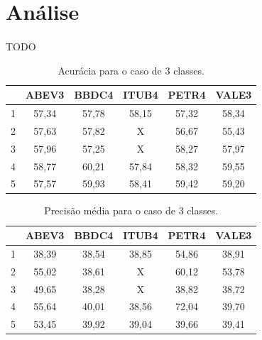 \documentclass[grad,numbers]{coppe}
\begin{document}
 		\section{Análise}
 			\paragraph{}TODO
 			\begin{table}[h]
 				\caption{Acurácia para o caso de 3 classes.}
 				\label{tab:3c_ac_analysis}
 				\centering
 				{\footnotesize
 					\begin{tabular}{|c|c|c|c|c|c|}
 						\hline
 						\diagbox[linewidth=0.2pt, width=\dimexpr \textwidth/10+2\tabcolsep\relax, height=0.8cm]{Dias}{Ativo}
 						& ABEV3 & BBDC4 & ITUB4 & PETR4 & VALE3\\
 						\hline
 						1 & 57,34 & 57,78 & 58,15 & 57,32 & 58,34 \\
 						2 & 57,63 & 57,82 & X     & 56,67 & 55,43 \\
 						3 & 57,96 & 57,25 & X     & 58,27 & 57,97 \\
 						4 & 58,77 & 60,21 & 57,84 & 58,32 & 59,55 \\
 						5 & 57,57 & 59,93 & 58,41 & 59,42 & 59,20 \\
 						\hline
 				\end{tabular}}
 			\end{table}
 			\begin{table}[h]
 				\caption{Precisão média para o caso de 3 classes.}
 				\label{tab:3c_pr_analysis}
 				\centering
 				{\footnotesize
 					\begin{tabular}{|c|c|c|c|c|c|}
 						\hline
 						\diagbox[linewidth=0.2pt, width=\dimexpr \textwidth/10+2\tabcolsep\relax, height=0.8cm]{Dias}{Ativo}
 						& ABEV3 & BBDC4 & ITUB4 & PETR4 & VALE3\\
 						\hline
 						1 & 38,39 & 38,54 & 38,85 & 54,86 & 38,91 \\
 						2 & 55,02 & 38,61 & X     & 60,12 & 53,78 \\
 						3 & 49,65 & 38,28 & X     & 38,82 & 38,72 \\
 						4 & 55,64 & 40,01 & 38,56 & 72,04 & 39,70 \\
 						5 & 53,45 & 39,92 & 39,04 & 39,66 & 39,41 \\
 						\hline
 				\end{tabular}}
 			\end{table}
\end{document}
